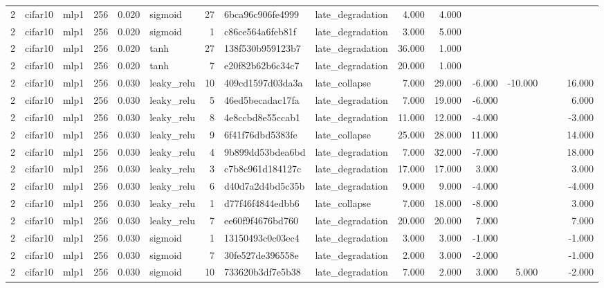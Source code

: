 \begin{table}[htbp]
{\begin{tabular}{@{}rllrrlrllrrrrrrr@{}}
2 & cifar10 & mlp1 & 256 & 0.020 & sigmoid & 27 & 6bca96c906fe4999 & late\_degradation & 4.000 & 4.000 &  &  &  &  &  \\
2 & cifar10 & mlp1 & 256 & 0.020 & sigmoid & 1 & c86ce564a6feb81f & late\_degradation & 3.000 & 5.000 &  &  &  &  &  \\
2 & cifar10 & mlp1 & 256 & 0.020 & tanh & 27 & 138f530b959123b7 & late\_degradation & 36.000 & 1.000 &  &  &  &  &  \\
2 & cifar10 & mlp1 & 256 & 0.020 & tanh & 7 & e20f82b62b6c34c7 & late\_degradation & 20.000 & 1.000 &  &  &  &  &  \\
2 & cifar10 & mlp1 & 256 & 0.030 & leaky\_relu & 10 & 409cd1597d03da3a & late\_collapse & 7.000 & 29.000 & -6.000 & -10.000 &  &  & 16.000 \\
2 & cifar10 & mlp1 & 256 & 0.030 & leaky\_relu & 5 & 46ed5becadac17fa & late\_degradation & 7.000 & 19.000 & -6.000 &  &  &  & 6.000 \\
2 & cifar10 & mlp1 & 256 & 0.030 & leaky\_relu & 8 & 4e8ccbd8e55ccab1 & late\_degradation & 11.000 & 12.000 & -4.000 &  &  &  & -3.000 \\
2 & cifar10 & mlp1 & 256 & 0.030 & leaky\_relu & 9 & 6f41f76dbd5383fe & late\_collapse & 25.000 & 28.000 & 11.000 &  &  &  & 14.000 \\
2 & cifar10 & mlp1 & 256 & 0.030 & leaky\_relu & 4 & 9b899dd53bdea6bd & late\_degradation & 7.000 & 32.000 & -7.000 &  &  &  & 18.000 \\
2 & cifar10 & mlp1 & 256 & 0.030 & leaky\_relu & 3 & c7b8c961d184127c & late\_degradation & 17.000 & 17.000 & 3.000 &  &  &  & 3.000 \\
2 & cifar10 & mlp1 & 256 & 0.030 & leaky\_relu & 6 & d40d7a2d4bd5c35b & late\_degradation & 9.000 & 9.000 & -4.000 &  &  &  & -4.000 \\
2 & cifar10 & mlp1 & 256 & 0.030 & leaky\_relu & 1 & d77f46f4844edbb6 & late\_collapse & 7.000 & 18.000 & -8.000 &  &  &  & 3.000 \\
2 & cifar10 & mlp1 & 256 & 0.030 & leaky\_relu & 7 & ee60f9f4676bd760 & late\_degradation & 20.000 & 20.000 & 7.000 &  &  &  & 7.000 \\
2 & cifar10 & mlp1 & 256 & 0.030 & sigmoid & 1 & 13150493c0c03ec4 & late\_degradation & 3.000 & 3.000 & -1.000 &  &  &  & -1.000 \\
2 & cifar10 & mlp1 & 256 & 0.030 & sigmoid & 7 & 30fe527de396558e & late\_degradation & 2.000 & 3.000 & -2.000 &  &  &  & -1.000 \\
2 & cifar10 & mlp1 & 256 & 0.030 & sigmoid & 10 & 733620b3df7e5b38 & late\_degradation & 7.000 & 2.000 & 3.000 & 5.000 &  &  & -2.000 \\

\end{tabular}}
\end{table}
